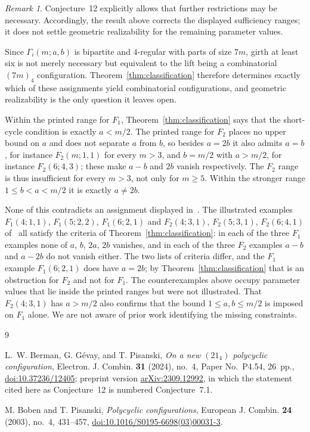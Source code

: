 \documentclass[11pt]{amsart}
\theoremstyle{remark}
\newtheorem{remark}[theorem]{Remark}
\begin{document}
\begin{remark}
Conjecture~12 explicitly allows that further restrictions may be necessary.
Accordingly, the result above corrects the displayed sufficiency ranges; it
does not settle geometric realizability for the remaining parameter values.

Since $\Gamma_i(m;a,b)$ is bipartite and $4$-regular with parts of size $7m$,
girth at least six is not merely necessary but equivalent to the lift being a
combinatorial $(7m)_4$ configuration. Theorem~\ref{thm:classification}
therefore determines exactly which of these assignments yield combinatorial
configurations, and geometric realizability is the only question it leaves
open.

Within the printed range for $F_1$, Theorem~\ref{thm:classification} says
that the short-cycle condition is exactly $a<m/2$. The printed range for
$F_2$ places no upper bound on $a$ and does not separate $a$ from $b$, so
besides $a=2b$ it also admits $a=b$, for instance $F_2(m;1,1)$ for every
$m>3$, and $b=m/2$ with
$a>m/2$, for instance $F_2(6;4,3)$; these make $a-b$ and $2b$ vanish
respectively. The $F_2$ range is thus insufficient for every $m>3$, not only
for $m\ge5$. Within the stronger range $1\le b<a<m/2$ it is exactly
$a\ne2b$.

None of this contradicts an assignment displayed in~\cite{BGP}. The
illustrated examples $F_1(4;1,1)$, $F_1(5;2,2)$, $F_1(6;2,1)$ and
$F_2(4;3,1)$, $F_2(5;3,1)$, $F_2(6;4,1)$ of~\cite[Figs.~11 and~12]{BGP} all
satisfy the criteria of Theorem~\ref{thm:classification}: in each of the three
$F_1$ examples none of $a$, $b$, $2a$, $2b$ vanishes, and in each of the three
$F_2$ examples $a-b$ and $a-2b$ do not vanish either. The two lists of
criteria differ, and the $F_1$ example $F_1(6;2,1)$ does have $a=2b$; by
Theorem~\ref{thm:classification} that is an obstruction for $F_2$ and not for
$F_1$. The counterexamples above occupy parameter values that
lie inside the printed ranges but were not illustrated. That $F_2(4;3,1)$ has
$a>m/2$ also confirms that the bound $1\le a,b\le m/2$ is imposed on $F_1$
alone. We are not aware of prior work identifying the missing constraints.
\end{remark}

\begin{thebibliography}{9}

L.~W. Berman, G. G\'evay, and T. Pisanski,
\emph{On a new $(21_4)$ polycyclic configuration},
Electron. J. Combin. \textbf{31} (2024), no.~4,
Paper No.~P4.54, 26~pp.,
\href{https://doi.org/10.37236/12405}{doi:10.37236/12405};
preprint version \href{https://arxiv.org/abs/2309.12992}{arXiv:2309.12992},
in which the statement cited here as Conjecture~12 is numbered
Conjecture~7.1.

M. Boben and T. Pisanski,
\emph{Polycyclic configurations},
European J. Combin. \textbf{24} (2003), no.~4, 431--457,
\href{https://doi.org/10.1016/S0195-6698(03)00031-3}
{doi:10.1016/S0195-6698(03)00031-3}.

\end{thebibliography}
\end{document}
